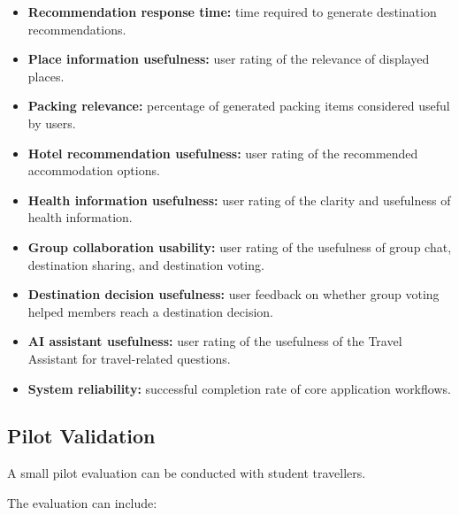 \documentclass[11pt,a4paper]{article}
\begin{document}
\begin{itemize}

\item \textbf{Recommendation response time:} time required to generate destination recommendations.

\item \textbf{Place information usefulness:} user rating of the relevance of displayed places.

\item \textbf{Packing relevance:} percentage of generated packing items considered useful by users.

\item \textbf{Hotel recommendation usefulness:} user rating of the recommended accommodation options.

\item \textbf{Health information usefulness:} user rating of the clarity and usefulness of health information.

\item \textbf{Group collaboration usability:} user rating of the usefulness of group chat, destination sharing, and destination voting.

\item \textbf{Destination decision usefulness:} user feedback on whether group voting helped members reach a destination decision.

\item \textbf{AI assistant usefulness:} user rating of the usefulness of the Travel Assistant for travel-related questions.

\item \textbf{System reliability:} successful completion rate of core application workflows.

\end{itemize}


\subsection{Pilot Validation}

A small pilot evaluation can be conducted with student travellers.

The evaluation can include:
\end{document}
